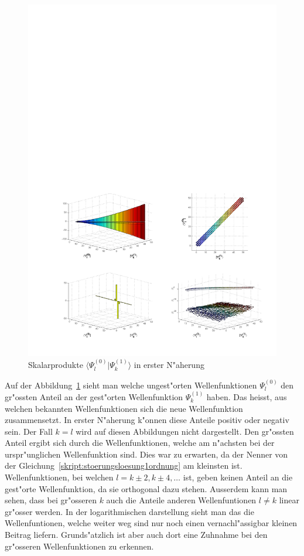 \begin{refsection}
\begin{figure}[h]	%
\centering
\includegraphics[width=1.0\textwidth]{anharmonisch/images/x3/Stoerung1Skalare.pdf}
\caption{Skalarprodukte $\langle\Psi_l^{(0)}|\Psi_k^{(1)}\rangle$ in erster N"aherung
\label{skript:x3_Stoerung1Skalare}}
\end{figure}

Auf der Abbildung~\ref{skript:x3_Stoerung1Skalare} sieht man welche ungest"orten Wellenfunktionen $\Psi_l^{(0)}$ den gr"ossten Anteil an der gest"orten Wellenfunktion $\Psi_k^{(1)}$ haben. Das heisst, aus welchen bekannten Wellenfunktionen sich die neue Wellenfunktion zusammensetzt. In erster N"aherung k"onnen diese Anteile positiv oder negativ sein. Der Fall $k=l$ wird auf diesen Abbildungen nicht dargestellt. Den gr"ossten Anteil ergibt sich durch die Wellenfunktionen, welche am n"achsten bei der urspr"unglichen Wellenfunktion sind. Dies war zu erwarten, da der Nenner von der Gleichung~\ref{skript:stoerungsloesung1ordnung} am kleinsten ist. Wellenfunktionen, bei welchen $l=k\pm 2,k\pm 4,\dots$ ist, geben keinen Anteil an die gest"orte Wellenfunktion, da sie orthogonal dazu stehen. Ausserdem kann man sehen, dass bei gr"osseren $k$ auch die Anteile anderen Wellenfuntionen $l\neq k$ linear gr"osser werden. In der logarithmischen darstellung sieht man das die Wellenfuntionen, welche weiter weg sind nur noch einen vernachl"assigbar kleinen Beitrag liefern. Grunds"atzlich ist aber auch dort eine Zuhnahme bei den gr"osseren Wellenfunktionen zu erkennen.



\end{refsection}

